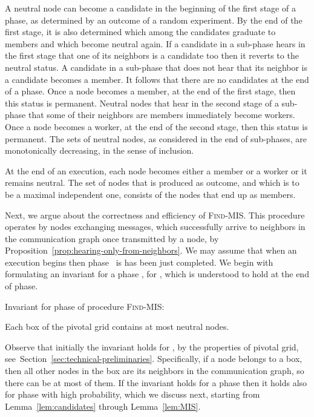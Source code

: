 \documentclass[11pt]{article}
\newcommand{\FF}{\vspace*{\medskipamount}}
\newlength{\pagewidth}
\begin{document}
A neutral node can become a candidate in the beginning of the first stage of a phase, as determined by an outcome of a random experiment. 
By the end of the first stage, it is also determined which among the candidates graduate to members and which become neutral again.
If a candidate in a sub-phase hears in the first stage that one of its neighbors is a candidate too then it reverts to the neutral status.
A candidate in a sub-phase that does not hear that its neighbor is a candidate becomes a member.
It follows that there are no candidates at the end of a phase.
Once a node becomes a member, at the end of the first stage, then this status is permanent.
Neutral nodes that hear in the second stage of a sub-phase that some of their neighbors are members immediately become workers.
Once a node becomes a worker, at the end of the second stage, then this status is permanent.
The sets of neutral nodes, as considered in the end of sub-phases, are monotonically decreasing,  in the sense of  inclusion.

At the end of an execution, each node becomes either a member or a worker or it remains neutral.
The set of nodes that is produced as outcome, and which is to be a maximal independent one, consists of the nodes that end up as members.

Next, we argue about the correctness and efficiency of  \textsc{Find-MIS}.
This procedure operates by nodes exchanging messages, which successfully arrive to neighbors in the communication graph once transmitted by a node, by Proposition~\ref{prop:hearing-only-from-neighbors}.
We may assume that when an execution begins then phase~ is has been just completed.
We begin with formulating  an invariant for a phase , for , which is understood to hold at the end of phase.

\begin{center}
\begin{minipage}{\pagewidth}
\textsf{Invariant for phase  of procedure \textsc{Find-MIS}:} 
\FF

Each box of the pivotal grid contains at most  neutral nodes.
\end{minipage}
\end{center}

Observe that initially the invariant holds for , by the properties of pivotal grid, see~Section~\ref{sec:technical-preliminaries}.
Specifically, if a node belongs to a box, then all other nodes in the box are its neighbors in the communication graph, so there can be at most  of them.
If the invariant holds for a phase  then it holds also for phase  with high probability, which we discuss next, starting from Lemma~\ref{lem:candidates} through Lemma~\ref{lem:MIS}.
\end{document}
